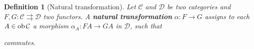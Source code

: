 \documentclass[a4paper]{article}
\newtheorem*{definition}{Definition}
\newcommand*\ob[1]{\textnormal{ob}\,#1}
\begin{document}
\begin{definition}[Natural transformation]
	Let $\mathcal{C}$ and $\mathcal{D}$ be two categories and $F, G: \mathcal{C} \rightrightarrows \mathcal{D}$ two functors. A \textbf{natural transformation} $\alpha:F\to G$ assigns to each $A \in \ob{\mathcal{C}}$ a morphism $\alpha_A:FA\to GA$ in $\mathcal{D}$, such that
	\begin{center}
	\end{center}
	commutes.
\end{definition}
\end{document}
